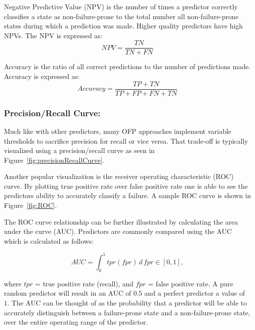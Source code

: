 Negative Predictive Value (NPV) is the number of times a predictor correctly classifies a state as non-failure-prone to the total number all non-failure-prone states during which a prediction was made.  Higher quality predictors have high NPVs.  The NPV is expressed as:
\[ \mathit{NPV}
	= \dfrac{TN}{TN + FN}
\]

Accuracy is the ratio of all correct predictions to the number of predictions made.  Accuracy is expressed as:
\[ Accuracy 
	= \dfrac{TP + TN}{TP + FP + FN + TN}
\]

\subsubsection{Precision/Recall Curve:}
Much like with other predictors, many OFP approaches implement variable thresholds to sacrifice precision for recall or vice versa.  That trade-off is typically visualized using a precision/recall curve as seen in Figure~\ref{fig:precisionRecallCurve}.

\figprecisionRecallCurve

Another popular visualization is the receiver operating characteristic (ROC) curve.  By plotting true positive rate over false positive rate one is able to see the predictors ability to accurately classify a failure.  A sample ROC curve is shown in Figure~\ref{fig:ROC}.

\figROC

The ROC curve relationship can be further illustrated by calculating the area under the curve (AUC).  Predictors are commonly compared using the AUC which is calculated as follows:

$$AUC = \int_{0}^{1} \mathit{tpr}(\mathit{fpr}) \,d\,\mathit{fpr} \in [0,1],$$

\noindent
where $tpr$ = true positive rate (recall), and $fpr$ = false positive rate.  A pure random predictor will result in an AUC of $0.5$ and a perfect predictor a value of~$1$.  The AUC can be thought of as the probability that a predictor will be able to accurately distinguish between a failure-prone state and a non-failure-prone state, over the entire operating range of the predictor.
